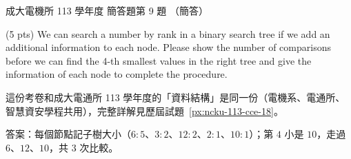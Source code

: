 \begin{pastexam}[label={px:ncku-113-ee-18}]{成大電機所 113 學年度 簡答題第 9 題}
（簡答）

(5 pts) We can search a number by rank in a binary search tree if we add an additional
information to each node. Please show the number of comparisons before we can find the 4-th
smallest values in the right tree and give the information of each node to complete the
procedure.

\begin{center}
\end{center}
\end{pastexam}

\begin{pastsoln}
這份考卷和成大電通所 113 學年度的「資料結構」是同一份（電機系、電通所、智慧資安學程共用），完整詳解見歷屆試題~\ref{px:ncku-113-cce-18}。

答案：每個節點記子樹大小（$6\colon 5$、$3\colon 2$、$12\colon 2$、$2\colon 1$、$10\colon 1$）；第 $4$ 小是 $10$，走過 $6$、$12$、$10$，共 $3$ 次比較。
\end{pastsoln}

